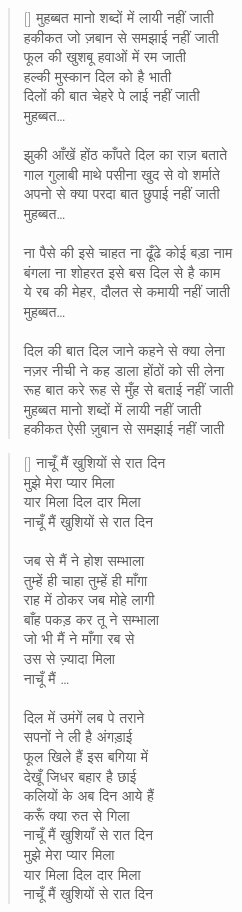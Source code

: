 \begin{verse}[\versewidth]\texthindi{
मुहब्बत मानो शब्दों में लायी नहीं जाती\\
हकीकत जो ज़बान से समझाई नहीं जाती\\
फूल की खुशबू हवाओं में रम जाती\\
हल्की मुस्कान दिल को है भाती\\
दिलों की बात चेहरे पे लाई नहीं जाती\\
मुहब्बत…\\
\\
झुकी आँखें होंठ काँपते दिल का राज़ बताते\\
गाल गुलाबी माथे पसीना खुद से वो शर्माते\\
अपनो से क्या परदा बात छुपाई नहीं जाती\\
मुहब्बत…\\
\\
ना पैसे की इसे चाहत ना ढूँढे कोई बड़ा नाम\\
बंगला ना शोहरत इसे बस दिल से है काम\\
ये रब की मेहर, दौलत से कमायी नहीं जाती\\
मुहब्बत…\\
\\
दिल की बात दिल जाने कहने से क्या लेना\\
नज़र नीची ने कह डाला होंठों को सी लेना\\
रूह बात करे रूह से मुँह से बताई नहीं जाती \\
मुहब्बत मानो शब्दों में लायी नहीं जाती\\
हकीकत ऐसी ज़ुबान से समझाई नहीं जाती
}
\end{verse}


\begin{verse}[\versewidth]\texthindi{
नाचूँ मैं खुशियों से रात दिन\\
मुझे मेरा प्यार मिला\\
यार मिला दिल दार मिला\\
नाचूँ मैं खुशियों से रात दिन\\
\\
जब से मैं ने होश सम्भाला\\
तुम्हें ही चाहा तुम्हें ही माँगा\\
राह में ठोकर जब मोहे लागी\\
बाँह पकड़ कर तू ने सम्भाला\\
जो भी मैं ने माँगा रब से\\
उस से ज़्यादा मिला\\
नाचूँ मैं …\\
\\
दिल में उमंगें लब पे तराने\\
सपनों ने ली है अंगड़ाई\\
फूल खिले हैं इस बगिया में\\
देखूँ जिधर बहार है छाई\\
कलियों के अब दिन आये हैं\\
करूँ क्या रुत से गिला\\
नाचूँ मैं खुशियाँ से रात दिन\\
मुझे मेरा प्यार मिला\\
यार मिला दिल दार मिला\\
नाचूँ मैं खुशियों से रात दिन
}
\end{verse}

